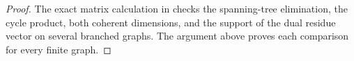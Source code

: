 \begin{proof}
The exact matrix calculation in
 checks the spanning-tree
elimination, the cycle product, both coherent dimensions, and the
support of the dual residue vector on several branched graphs.
The argument above proves each comparison for every finite graph.
\end{proof}

